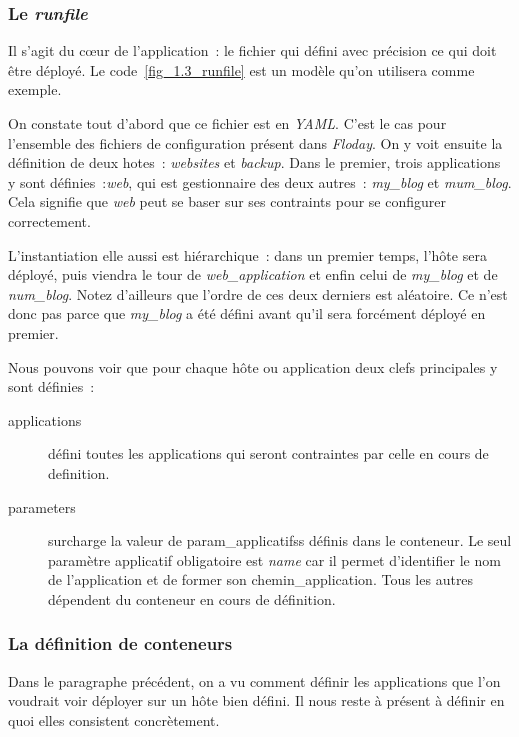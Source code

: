\subsubsection{Le \emph{runfile}}



Il s'agit du cœur de l'application~: le fichier qui défini avec précision ce qui doit être déployé.
Le code~\ref{fig_1.3_runfile} est un modèle qu'on utilisera comme exemple.

On constate tout d'abord que ce fichier est en \emph{YAML}.
C'est le cas pour l'ensemble des fichiers de configuration présent dans \emph{Floday}.
On y voit ensuite la définition de deux \glspl{hote}~: \emph{websites} et \emph{backup}.
Dans le premier, trois \glspl{application} y sont définies~:\emph{web}, qui est \gls{gestionnaire} des deux autres~: \emph{my\_blog} et \emph{mum\_blog}.
Cela signifie que \emph{web} peut se baser sur ses \glspl{contraint} pour se configurer correctement.

L'\gls{instantiation} elle aussi est hiérarchique~: dans un premier temps, l'hôte sera déployé, puis viendra le tour de \emph{web\_application} et enfin celui de \emph{my\_blog} et de \emph{num\_blog}.
Notez d'ailleurs que l'ordre de ces deux derniers est aléatoire.
Ce n'est donc pas parce que \emph{my\_blog} a été défini avant qu'il sera forcément déployé en premier.

Nous pouvons voir que pour chaque hôte ou application deux clefs principales y sont définies~:
\begin{description}
	\item[applications] défini toutes les applications qui seront contraintes par celle en cours de \gls{definition}.
	\item[parameters] surcharge la valeur de \glspl{param_applicatifs} définis dans le conteneur.
		Le seul paramètre applicatif obligatoire est \emph{name} car il permet d'identifier le nom de l'application et de former son \gls{chemin_application}.
		Tous les autres dépendent du conteneur en cours de définition.
\end{description}

\subsubsection{La définition de conteneurs}

Dans le paragraphe précédent, on a vu comment définir les \glspl{application} que l'on voudrait voir déployer sur un hôte bien défini.
Il nous reste à présent à définir en quoi elles consistent concrètement.

